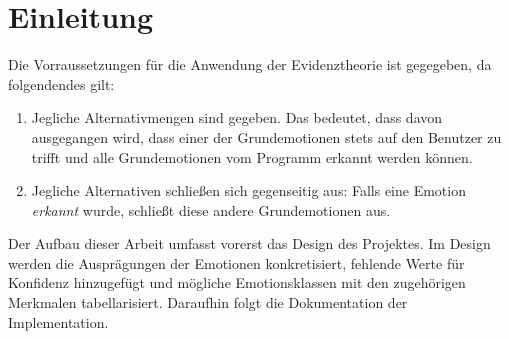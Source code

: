 \chapter{Einleitung}
Die Vorraussetzungen für die Anwendung der Evidenztheorie ist gegegeben, da folgendendes gilt:

\begin{enumerate}
  \item Jegliche Alternativmengen sind gegeben. Das bedeutet, dass davon ausgegangen wird, dass einer der Grundemotionen stets auf den Benutzer zu trifft und alle Grundemotionen vom Programm erkannt werden können. 
  \item Jegliche Alternativen schließen sich gegenseitig aus: Falls eine Emotion \textit{erkannt} wurde, schließt diese andere Grundemotionen aus.
\end{enumerate}


Der Aufbau dieser Arbeit umfasst vorerst das Design des Projektes. Im Design werden die Ausprägungen der Emotionen konkretisiert, fehlende Werte für Konfidenz hinzugefügt und mögliche Emotionsklassen mit den zugehörigen Merkmalen tabellarisiert. Daraufhin folgt die Dokumentation der Implementation. 